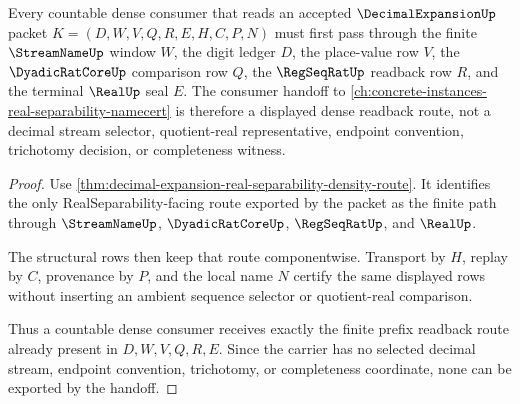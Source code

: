 \begin{theorem}\label{thm:decimal-expansion-countable-dense-consumer-handoff}
Every countable dense consumer that reads an accepted $\DecimalExpansionUp$ packet $K=(D,W,V,Q,R,E,H,C,P,N)$ must first pass through the finite $\StreamNameUp$ window $W$, the digit ledger $D$, the place-value row $V$, the $\DyadicRatCoreUp$ comparison row $Q$, the $\RegSeqRatUp$ readback row $R$, and the terminal $\RealUp$ seal $E$. The consumer handoff to \autoref{ch:concrete-instances-real-separability-namecert} is therefore a displayed dense readback route, not a decimal stream selector, quotient-real representative, endpoint convention, trichotomy decision, or completeness witness.
\end{theorem}
\begin{proof}
Use \autoref{thm:decimal-expansion-real-separability-density-route}. It identifies the only RealSeparability-facing route exported by the packet as the finite path through $\StreamNameUp$, $\DyadicRatCoreUp$, $\RegSeqRatUp$, and $\RealUp$.

The structural rows then keep that route componentwise. Transport by $H$, replay by $C$, provenance by $P$, and the local name $N$ certify the same displayed rows without inserting an ambient sequence selector or quotient-real comparison.

Thus a countable dense consumer receives exactly the finite prefix readback route already present in $D,W,V,Q,R,E$. Since the carrier has no selected decimal stream, endpoint convention, trichotomy, or completeness coordinate, none can be exported by the handoff.
\end{proof}

